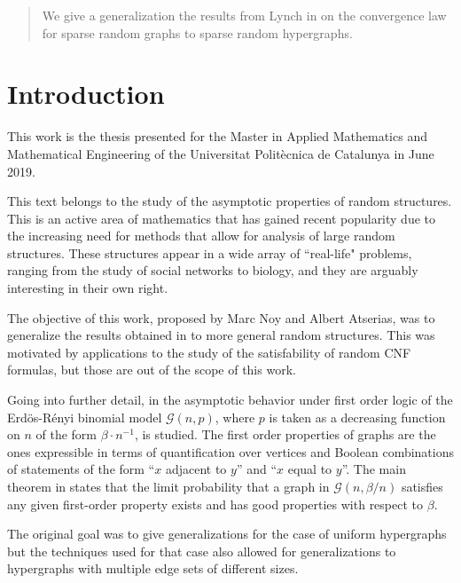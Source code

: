 \documentclass[11pt,notitlepage,a4paper]{article}
\theoremstyle{definition}
\begin{document}
	
	
	
\begin{abstract}
	We give a generalization the results from Lynch in \cite{lynch1992probabilities}
	on the convergence law for sparse random graphs to sparse random hypergraphs.
\end{abstract}
\clearpage
\tableofcontents
\clearpage

\section*{Introduction}

This work is the thesis presented for the Master in Applied Mathematics and 
Mathematical Engineering of the Universitat Politècnica de Catalunya in 
June 2019. \par

This text belongs to the study of the asymptotic properties of random structures.
This is an active area of mathematics that has gained recent popularity due to 
the increasing need for methods that allow for analysis of large random
structures. These structures appear in a wide array of 
``real-life" problems, ranging
from the study of social networks to biology, and they are
arguably interesting in their own right.\par

The objective of this work, proposed by Marc Noy and Albert Atserias, was 
to generalize the results obtained in \cite{lynch1992probabilities} to more
general random structures. This was motivated by applications to the study
of the satisfability of random CNF formulas, but those are out of the scope of 
this work. \par

Going into further detail, in \cite{lynch1992probabilities} the asymptotic 
behavior under first order logic of the Erdös-Rényi binomial model $\mathcal{G}(n,p)$, where
$p$ is taken as a decreasing function on $n$ of the form $\beta\cdot n^{-1}$,
is studied. The first order properties of graphs are the ones expressible in 
terms of quantification over vertices and Boolean combinations of statements 
of the form ``$x$ adjacent to $y$'' and  ``$x$ equal to $y$''. The main theorem
in \cite{lynch1992probabilities} states that the limit probability that a graph
in $\mathcal{G}(n,\beta/n)$ satisfies any given first-order property exists
and has good properties with respect to $\beta$. \par


The original goal was to give generalizations for the case of uniform hypergraphs
but the techniques used for that case also allowed for generalizations to 
hypergraphs with multiple edge sets of different sizes.  
\end{document}
